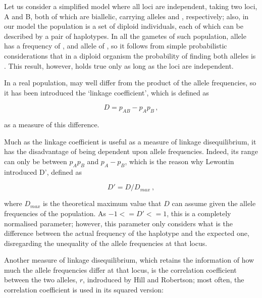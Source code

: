 \documentclass[../main.tex]{subfiles}
\begin{document}
Let us consider a simplified model where all loci are independent, 
taking two loci, A and B, both of which are biallelic, carrying alleles 
 and , respectively; also, in our model the 
population is a set of diploid individuals, each of which can be 
described by a pair of haplotypes. In all the gametes of such 
population, allele  has a frequency of , and allele 
 of , so it follows from simple probabilistic 
considerations that in a diploid organism the probability of finding 
both alleles is . This result, however, holds 
true only as long as the loci are independent.

In a real population,  may well differ from the product of 
the allele frequencies, so it has been introduced the `linkage 
coefficient', which is defined as

\begin{equation}
\label{eq:linkagecoeff}
D = p_{AB} - p_A p_B\,,
\end{equation}

as a measure of this difference.

Much as the linkage coefficient is useful as a measure of linkage 
disequilibrium, it has the disadvantage of being dependent upon allele 
frequencies. Indeed, its range can only be between \(p_A p_B\) and \(p_A 
	- p_B\), which is the reason why Lewontin\cite{lewontin1964} 
introduced D', defined as

\begin{equation}
\label{eq:linkagecoefflewontin}
D' = D / D_{max}\ ,
\end{equation}

where \(D_{max}\) is the theoretical maximum value that \(D\) can assume 
given the allele frequencies of the population. As \(-1 <= D' <= 1\), 
this is a completely normalised parameter; however, this parameter only 
considers what is the difference between the actual frequency of the 
 haplotype and the expected one, disregarding the unequality of 
the allele frequencies at that locus.

Another measure of linkage disequilibrium, which retains the information 
of how much the allele frequencies differ at that locus, is the 
correlation coefficient
between the two alleles, \(r\), indroduced by Hill and 
Robertson\cite{hill1968}; most often, the correlation coefficient is 
used in its squared version:
\end{document}
